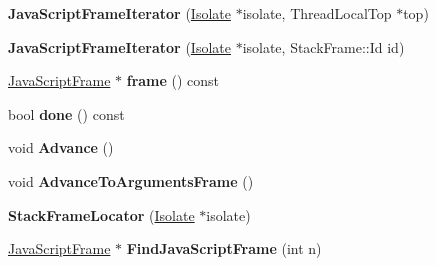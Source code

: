 \begin{DoxyCompactItemize}
\item 
\hypertarget{classv8_1_1internal_1_1_b_a_s_e___e_m_b_e_d_d_e_d_a95dfa5734e74d4a43c74f9ec9d7a13b6}{}{\bfseries Java\+Script\+Frame\+Iterator} (\hyperlink{classv8_1_1internal_1_1_isolate}{Isolate} $\ast$isolate, Thread\+Local\+Top $\ast$top)\label{classv8_1_1internal_1_1_b_a_s_e___e_m_b_e_d_d_e_d_a95dfa5734e74d4a43c74f9ec9d7a13b6}

\item 
\hypertarget{classv8_1_1internal_1_1_b_a_s_e___e_m_b_e_d_d_e_d_aa3a4c7a3703d5ef721fe1609bcf5c790}{}{\bfseries Java\+Script\+Frame\+Iterator} (\hyperlink{classv8_1_1internal_1_1_isolate}{Isolate} $\ast$isolate, Stack\+Frame\+::\+Id id)\label{classv8_1_1internal_1_1_b_a_s_e___e_m_b_e_d_d_e_d_aa3a4c7a3703d5ef721fe1609bcf5c790}

\item 
\hypertarget{classv8_1_1internal_1_1_b_a_s_e___e_m_b_e_d_d_e_d_aea088b4f4a123cb42876c73cad29e69a}{}\hyperlink{classv8_1_1internal_1_1_java_script_frame}{Java\+Script\+Frame} $\ast$ {\bfseries frame} () const \label{classv8_1_1internal_1_1_b_a_s_e___e_m_b_e_d_d_e_d_aea088b4f4a123cb42876c73cad29e69a}

\item 
\hypertarget{classv8_1_1internal_1_1_b_a_s_e___e_m_b_e_d_d_e_d_ad9fdb6cfd2406541e703f9d0719ef6d6}{}bool {\bfseries done} () const \label{classv8_1_1internal_1_1_b_a_s_e___e_m_b_e_d_d_e_d_ad9fdb6cfd2406541e703f9d0719ef6d6}

\item 
\hypertarget{classv8_1_1internal_1_1_b_a_s_e___e_m_b_e_d_d_e_d_a4b06fdbbb29fc7d6641a995803b6d7ec}{}void {\bfseries Advance} ()\label{classv8_1_1internal_1_1_b_a_s_e___e_m_b_e_d_d_e_d_a4b06fdbbb29fc7d6641a995803b6d7ec}

\item 
\hypertarget{classv8_1_1internal_1_1_b_a_s_e___e_m_b_e_d_d_e_d_ab709bbf6ee2cb89338f56142a7657d91}{}void {\bfseries Advance\+To\+Arguments\+Frame} ()\label{classv8_1_1internal_1_1_b_a_s_e___e_m_b_e_d_d_e_d_ab709bbf6ee2cb89338f56142a7657d91}

\item 
\hypertarget{classv8_1_1internal_1_1_b_a_s_e___e_m_b_e_d_d_e_d_ad4e726e3766b0b106ceaff82b6fbf826}{}{\bfseries Stack\+Frame\+Locator} (\hyperlink{classv8_1_1internal_1_1_isolate}{Isolate} $\ast$isolate)\label{classv8_1_1internal_1_1_b_a_s_e___e_m_b_e_d_d_e_d_ad4e726e3766b0b106ceaff82b6fbf826}

\item 
\hypertarget{classv8_1_1internal_1_1_b_a_s_e___e_m_b_e_d_d_e_d_a1c8959de68e7483ea82d6e986f189056}{}\hyperlink{classv8_1_1internal_1_1_java_script_frame}{Java\+Script\+Frame} $\ast$ {\bfseries Find\+Java\+Script\+Frame} (int n)\label{classv8_1_1internal_1_1_b_a_s_e___e_m_b_e_d_d_e_d_a1c8959de68e7483ea82d6e986f189056}


\end{DoxyCompactItemize}
